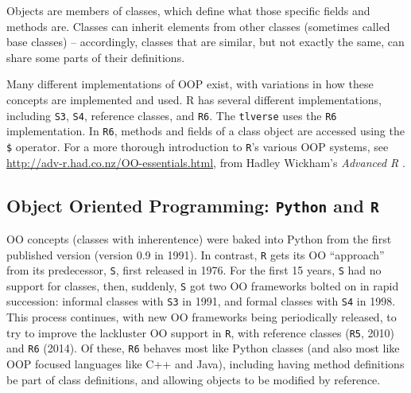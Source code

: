 \documentclass[12pt, krantz2,]{krantz}
\theoremstyle{definition}
\theoremstyle{definition}
\theoremstyle{definition}
\newcommand{\1}{\mathbbm{1}}
\begin{document}
Objects are members of classes, which define what those specific fields and
methods are. Classes can inherit elements from other classes (sometimes called
base classes) -- accordingly, classes that are similar, but not exactly the
same, can share some parts of their definitions.

Many different implementations of OOP exist, with variations in how these
concepts are implemented and used. R has several different implementations,
including \texttt{S3}, \texttt{S4}, reference classes, and \texttt{R6}. The \texttt{tlverse} uses the \texttt{R6}
implementation. In \texttt{R6}, methods and fields of a class object are accessed using
the \texttt{\$} operator. For a more thorough introduction to \texttt{R}'s various OOP systems,
see \url{http://adv-r.had.co.nz/OO-essentials.html}, from Hadley Wickham's \emph{Advanced
R} \citep{wickham2014advanced}.

\hypertarget{object-oriented-programming-python-and-r}{%
\subsection{\texorpdfstring{Object Oriented Programming: \texttt{Python} and \texttt{R}}{Object Oriented Programming: Python and R}}\label{object-oriented-programming-python-and-r}}

OO concepts (classes with inherentence) were baked into Python from the first
published version (version 0.9 in 1991). In contrast, \texttt{R} gets its OO ``approach''
from its predecessor, \texttt{S}, first released in 1976. For the first 15 years, \texttt{S}
had no support for classes, then, suddenly, \texttt{S} got two OO frameworks bolted on
in rapid succession: informal classes with \texttt{S3} in 1991, and formal classes with
\texttt{S4} in 1998. This process continues, with new OO frameworks being periodically
released, to try to improve the lackluster OO support in \texttt{R}, with reference
classes (\texttt{R5}, 2010) and \texttt{R6} (2014). Of these, \texttt{R6} behaves most like Python
classes (and also most like OOP focused languages like C++ and Java), including
having method definitions be part of class definitions, and allowing objects to
be modified by reference.



\backmatter
\printindex
\end{document}
